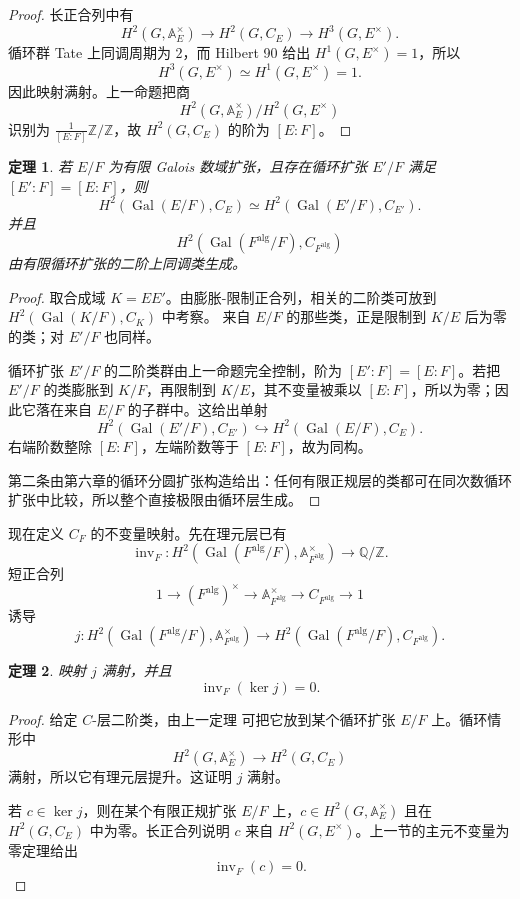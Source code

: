 \documentclass[11pt,a4paper,openany]{ctexbook}
\numberwithin{equation}{chapter}
\newcommand{\Q}{\mathbb{Q}}
\newcommand{\Z}{\mathbb{Z}}
\newcommand{\A}{\mathbb{A}}
\newcommand{\Gal}{\operatorname{Gal}}
\theoremstyle{plain}
\newtheorem{theorem}{定理}[chapter]
\theoremstyle{definition}
\theoremstyle{remark}
\begin{document}
\begin{proof}
长正合列中有
\[
H^2(G,\A_E^\times)\to H^2(G,C_E)\to H^3(G,E^\times).
\]
循环群 Tate 上同调周期为 $2$，而 Hilbert 90 给出 $H^1(G,E^\times)=1$，所以
\[
H^3(G,E^\times)\simeq H^1(G,E^\times)=1.
\]
因此映射满射。上一命题把商
\[
H^2(G,\A_E^\times)/H^2(G,E^\times)
\]
识别为 $\frac1{[E:F]}\Z/\Z$，故 $H^2(G,C_E)$ 的阶为 $[E:F]$。
\end{proof}

\begin{theorem}
若 $E/F$ 为有限 Galois 数域扩张，且存在循环扩张 $E'/F$ 满足 $[E':F]=[E:F]$，则
\[
H^2(\Gal(E/F),C_E)\simeq H^2(\Gal(E'/F),C_{E'}).
\]
并且
\[
H^2(\Gal(F^{\mathrm{alg}}/F),C_{F^{\mathrm{alg}}})
\]
由有限循环扩张的二阶上同调类生成。
\end{theorem}

\begin{proof}
取合成域 $K=EE'$。由膨胀-限制正合列，相关的二阶类可放到 $H^2(\Gal(K/F),C_K)$ 中考察。
来自 $E/F$ 的那些类，正是限制到 $K/E$ 后为零的类；对 $E'/F$ 也同样。

循环扩张 $E'/F$ 的二阶类群由上一命题完全控制，阶为 $[E':F]=[E:F]$。若把 $E'/F$ 的类膨胀到 $K/F$，再限制到 $K/E$，其不变量被乘以 $[E:F]$，所以为零；因此它落在来自 $E/F$ 的子群中。这给出单射
\[
H^2(\Gal(E'/F),C_{E'})\hookrightarrow H^2(\Gal(E/F),C_E).
\]
右端阶数整除 $[E:F]$，左端阶数等于 $[E:F]$，故为同构。

第二条由第六章的循环分圆扩张构造给出：任何有限正规层的类都可在同次数循环扩张中比较，所以整个直接极限由循环层生成。
\end{proof}

现在定义 $C_F$ 的不变量映射。先在理元层已有
\[
\operatorname{inv}_F:H^2(\Gal(F^{\mathrm{alg}}/F),\A_{F^{\mathrm{alg}}}^\times)\to \Q/\Z.
\]
短正合列
\[
1\to (F^{\mathrm{alg}})^\times\to\A_{F^{\mathrm{alg}}}^\times\to C_{F^{\mathrm{alg}}}\to1
\]
诱导
\[
j:H^2(\Gal(F^{\mathrm{alg}}/F),\A_{F^{\mathrm{alg}}}^\times)
\to H^2(\Gal(F^{\mathrm{alg}}/F),C_{F^{\mathrm{alg}}}).
\]

\begin{theorem}
映射 $j$ 满射，并且
\[
\operatorname{inv}_F(\ker j)=0.
\]
\end{theorem}

\begin{proof}
给定 $C$-层二阶类，由上一定理 可把它放到某个循环扩张 $E/F$ 上。循环情形中
\[
H^2(G,\A_E^\times)\to H^2(G,C_E)
\]
满射，所以它有理元层提升。这证明 $j$ 满射。

若 $c\in\ker j$，则在某个有限正规扩张 $E/F$ 上，$c\in H^2(G,\A_E^\times)$ 且在 $H^2(G,C_E)$ 中为零。长正合列说明 $c$ 来自 $H^2(G,E^\times)$。上一节的主元不变量为零定理给出
\[
\operatorname{inv}_F(c)=0.
\]
\end{proof}
\end{document}
